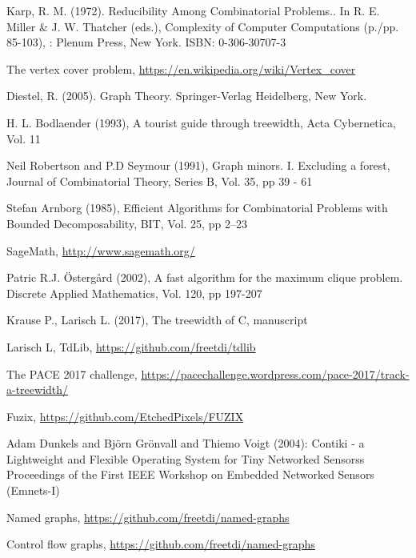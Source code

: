 \documentclass[11pt,a4paper]{article}
\begin{document}
\begin{thebibliography}{9}

 Karp, R. M. (1972). Reducibility Among Combinatorial Problems.. In R. E. Miller \& J. W. Thatcher (eds.), Complexity of Computer Computations (p./pp. 85-103), : Plenum Press, New York. ISBN: 0-306-30707-3

 The vertex cover problem, \url{https://en.wikipedia.org/wiki/Vertex_cover}

 Diestel, R. (2005). Graph Theory. Springer-Verlag Heidelberg, New York. 

 H. L. Bodlaender (1993), A tourist guide through treewidth, Acta Cybernetica, Vol. 11

 Neil Robertson and P.D Seymour (1991), Graph minors. I. Excluding a forest, Journal of Combinatorial Theory, Series B, Vol. 35, pp 39 - 61

 Stefan Arnborg (1985), Efficient Algorithms for Combinatorial Problems with Bounded Decomposability, BIT, Vol. 25, pp 2--23

 SageMath, \url{http://www.sagemath.org/}

 Patric R.J. Östergård (2002), A fast algorithm for the maximum clique problem. Discrete Applied Mathematics, Vol. 120, pp 197-207

 Krause P., Larisch L. (2017), The treewidth of C, manuscript

 Larisch L, TdLib, \url{https://github.com/freetdi/tdlib}

 The PACE 2017 challenge, \url{https://pacechallenge.wordpress.com/pace-2017/track-a-treewidth/}

 Fuzix, \url{https://github.com/EtchedPixels/FUZIX}

 Adam Dunkels and Björn Grönvall and Thiemo Voigt (2004): Contiki - a Lightweight and Flexible Operating System for Tiny Networked Sensorss Proceedings of the First IEEE Workshop on Embedded Networked Sensors (Emnets-I)

 Named graphs, \url{https://github.com/freetdi/named-graphs}

 Control flow graphs, \url{https://github.com/freetdi/named-graphs}


\end{thebibliography}

\newpage
\end{document}
